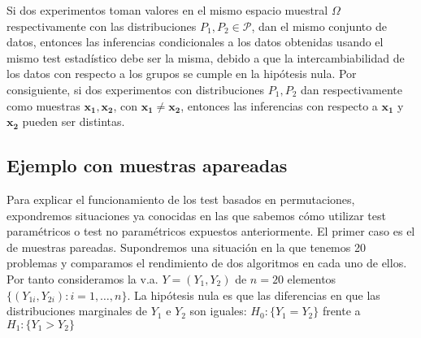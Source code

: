 \begin{definicion}
	Si dos experimentos toman valores en el mismo espacio
muestral $\Omega$ respectivamente con las distribuciones 
$P_1, P_2 \in \mathcal{P}$, dan el mismo conjunto de datos, 
entonces las inferencias condicionales a los datos obtenidas 
usando el mismo test estadístico debe 
ser la misma, debido a que la intercambiabilidad de los datos con 
respecto a los grupos se cumple en la hipótesis nula. Por 
consiguiente, si dos experimentos con distribuciones 
$P_1, P_2$ dan respectivamente como muestras $\mathbf{x_1}, 
\mathbf{x_2}$, con $\mathbf{x_1} \neq \mathbf{x_2}$, entonces 
las inferencias con respecto a $\mathbf{x_1}$ y 
$\mathbf{x_2}$ pueden ser distintas.
\end{definicion}


\subsection{Ejemplo con muestras apareadas}

	Para explicar el funcionamiento de los test basados en 
permutaciones, expondremos situaciones ya conocidas en las 
que sabemos cómo utilizar test paramétricos o test no 
paramétricos expuestos anteriormente. El primer caso es el de 
muestras pareadas. Supondremos una situación en la que 
tenemos 20 problemas y comparamos el rendimiento de dos
algoritmos en cada uno de ellos.
Por tanto consideramos la v.a. $Y = (Y_1, Y_2)$ de $n=20$ 
elementos $\{(Y_{1i},Y_{2i}): i = 1, \dots, n\}$. La 
hipótesis nula es que las diferencias en que las 
distribuciones marginales de $Y_1$ e $Y_2$ son iguales:
$H_0 : \{ Y_1 = Y_2 \}$ frente a $H_1: \{ Y_1 > Y_2 \}$\\
	
